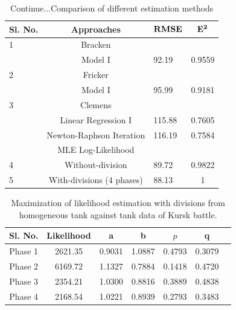\documentclass[]{article}
\begin{document}
\begin{table}
\centering
\tiny
\caption{Continue...Comparison of different estimation methods}\label{table}

{\begin{tabular}{|p{.1cm}|c|p{.8cm}|c|}   \hline\hline
\bf{Sl. No.} & \bf{Approaches} &		$\bf{RMSE}$ &	${\bf{E^2}}$ \\
\hline
\hline
1&Bracken\autocite{Bracken:1995}& &  \\
\hline
&Model I&92.19&0.9559\\
\hline
2&Fricker\autocite{Fricker:1998}& &  \\
\hline
&Model I&95.99&0.9181\\
\hline
3&Clemens\autocite{Clemens:1997}& &  \\
\hline
&Linear Regression I&115.88&0.7605\\
\hline
&Newton-Raphson Iteration&116.19&0.7584\\
\hline
&MLE Log-Likelihood \autocite{Das:2007}& &  \\
\hline
4&Without-division&89.72&0.9822\\
\hline
5&With-divisions (4 phases)&88.13&1\\
\hline
\hline
\end{tabular}}
\end{table}


\begin{table}
\centering
\tiny
\caption{Maximization of likelihood estimation with divisions from homogeneous tank against tank data of Kursk battle. }
{\begin{tabular}{|c|c|c|c|c|c|c|}   \hline\hline
\bf{Sl. No.} & \bf{Likelihood} &	\bf{a}	& \bf{b} & \bf{$p$} & \bf{q} \\
\hline
\hline
Phase 1	&2621.35	&0.9031	&1.0887	&0.4793&	0.3079\\
\hline
Phase 2	&6169.72	&1.1327	&0.7884	&0.1418	&0.4720\\
\hline
Phase 3	&2354.21	&1.0300	&0.8816	&0.3889	&0.4838\\
\hline
Phase 4	&2168.54	&1.0221	&0.8939	&0.2793	&0.3483\\
\hline
\end{tabular}}
\end{table}
\end{document}
